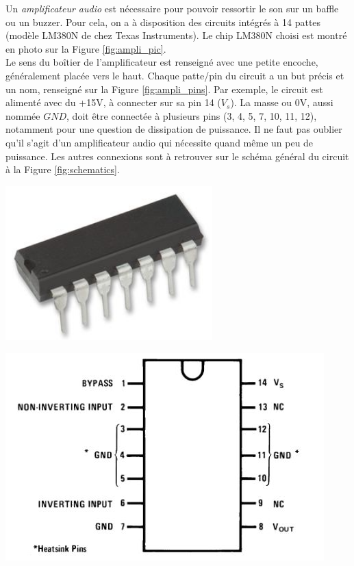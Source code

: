 
Un \emph{amplificateur audio} est nécessaire pour pouvoir ressortir le son sur un baffle ou un buzzer. Pour cela, on a à disposition des circuits intégrés à 14 pattes (modèle LM380N de chez Texas Instruments). Le chip LM380N choisi est montré en photo sur la Figure \ref{fig:ampli_pic}.\\

Le sens du boîtier de l'amplificateur est renseigné avec une petite encoche, généralement placée vers le haut. Chaque patte/pin du circuit a un but précis et un nom, renseigné sur la Figure \ref{fig:ampli_pins}. Par exemple, le circuit est alimenté avec du +15V, à connecter sur sa pin 14 ($V_s$). La masse ou 0V, aussi nommée $GND$, doit être connectée à plusieurs pins (3, 4, 5, 7, 10, 11, 12), notamment pour une question de dissipation de puissance. Il ne faut pas oublier qu'il s'agit d'un amplificateur audio qui nécessite quand même un peu de puissance. Les autres connexions sont à retrouver sur le schéma général du circuit à la Figure \ref{fig:schematics}.\\

\begin{minipage}[c]{.49\textwidth}
	\centering
	\includegraphics[width=0.6\textwidth]{figures/LM380N_picture.jpg}
	\label{fig:ampli_pic}
\end{minipage}
\hfill
\begin{minipage}[c]{.49\textwidth}
	\centering
	\includegraphics[width=\textwidth]{figures/LM380N_sch.jpg}
	\label{fig:ampli_pins}
\end{minipage}
\vspace{1cm}